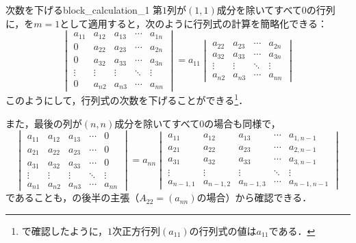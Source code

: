 \begin{example}{次数を下げる}{block_calculation_1}
  第$1$列が$(1,1)$成分を除いてすべて$0$の行列に，を$m = 1$として適用すると，次のように行列式の計算を簡略化できる：
  \[
  \begin{vmatrix} 
    a_{11} & a_{12} & a_{13} & \cdots & a_{1n} \\
    0      & a_{22} & a_{23} & \cdots & a_{2n} \\
    0      & a_{32} & a_{33} & \cdots & a_{3n} \\
    \vdots & \vdots & \vdots & \ddots & \vdots \\
    0      & a_{n2} & a_{n3} & \cdots & a_{nn}
  \end{vmatrix}
  =
  a_{11}
  \begin{vmatrix} 
    a_{22} & a_{23} & \cdots & a_{2n} \\
    a_{32} & a_{33} & \cdots & a_{3n} \\
    \vdots & \vdots & \ddots & \vdots \\
    a_{n2} & a_{n3} & \cdots & a_{nn}
  \end{vmatrix}
  \]
  このようにして，行列式の次数を下げることができる\footnote{で確認したように，$1$次正方行列$(a_{11})$の行列式の値は$a_{11}$である．}．

  また，最後の列が$(n,n)$成分を除いてすべて$0$の場合も同様で，
  \[
  \begin{vmatrix} 
    a_{11} &  a_{12} & a_{13} & \cdots &  0 \\
    a_{21} &  a_{22} & a_{23} & \cdots &  0 \\
    a_{31} &  a_{32} & a_{33} & \cdots &  0 \\
    \vdots &  \vdots & \vdots & \ddots &  \vdots \\
    a_{n1} &  a_{n2} & a_{n3} & \cdots &  a_{nn}
  \end{vmatrix}
  =
  a_{nn}
  \begin{vmatrix} 
    a_{11} &  a_{12} & a_{13} & \cdots &  a_{1,n-1} \\
    a_{21} &  a_{22} & a_{23} & \cdots &  a_{2,n-1} \\
    a_{31} &  a_{32} & a_{33} & \cdots &  a_{3,n-1} \\
    \vdots &  \vdots & \vdots & \ddots &  \vdots \\
    a_{n-1,1} &  a_{n-1,2} & a_{n-1,3} & \cdots &  a_{n-1,n-1}
  \end{vmatrix}
  \]
  であることも，の後半の主張（$A_{22} = (a_{nn})$の場合）から確認できる．
\end{example}

